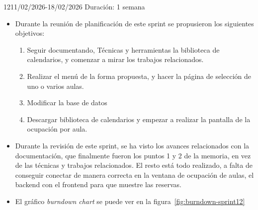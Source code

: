 \begin{Sprint}{12}{11/02/2026-18/02/2026}
	Duración: 1 semana
	\begin{itemize}	
		\item{}
		Durante la reunión de planificación de este sprint se propusieron los siguientes objetivos:
		\begin{enumerate}
			\item Seguir documentando, Técnicas y herramientas la biblioteca de calendarios, y comenzar a mirar los trabajos relacionados.
			\item Realizar el menú de la forma propuesta, y hacer la página de selección de uno o varios aulas.
			\item Modificar la base de datos
			\item Descargar biblioteca de calendarios y empezar a realizar la pantalla de la ocupación por aula.
		\end{enumerate}
		\item{}
		Durante la revisión de este sprint, se ha visto los avances relacionados con la documentación, que finalmente fueron los puntos 1 y 2 de la memoria, en vez de las técnicas y trabajos relacionados. El resto está todo realizado, a falta de conseguir conectar de manera correcta en la ventana de ocupación de aulas, el backend con el frontend para que muestre las reservas.
		
		\item{}
		El gráfico \textit{burndown chart} se puede ver en la figura~\ref{fig:burndown-sprint12}
	\end{itemize}
\end{Sprint}

